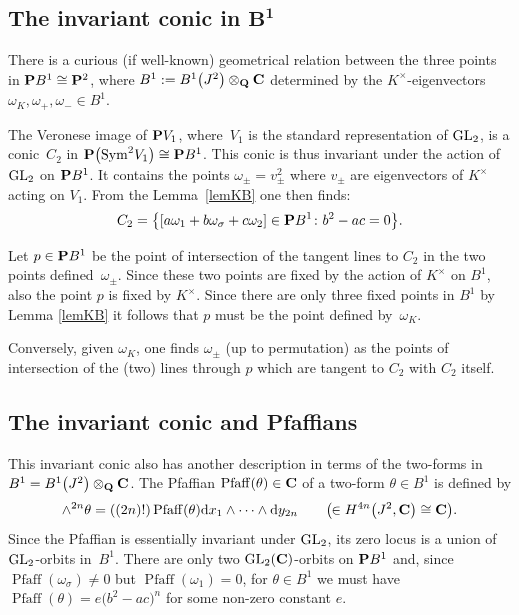 \documentclass[10pt,a4paper]{amsart}
\numberwithin{equation}{section}
\begin{document}
\subsection[The invariant conic in B\^{}1]{The invariant conic in $\boldsymbol{B^1}$}\label{invcon}

There is a curious (if well-known) geometrical relation between the three
points in ${\bf P} B^1\cong{\bf P}^2$, where $B^1:=B^1\big(J^2\big)\otimes_{\bf Q} {\bf C}$
determined by the $K^\times$-eigenvectors
$\omega_K, \omega_+, \omega_-\in B^1$.

The Veronese image of ${\bf P} V_1$, where~$V_1$ is the standard representation of ${\rm GL}_2$,
is a conic~$C_2$ in ${\bf P}\big({\operatorname{Sym}}^2 V_1\big)\cong{\bf P} B^1$. This conic is thus invariant under the action
of ${\rm GL}_2$ on ${\bf P} B^1$.
It contains the points $\omega_\pm=v^2_\pm$
where $v_\pm$ are eigenvectors of $K^\times$ acting on $V_1$.
From the Lemma~\ref{lemKB} one then finds:
\[
C_2 = \big\{[a\omega_1+b\omega_\sigma+c\omega_2] \in {\bf P} B^1\colon b^2-ac = 0 \big\}.
\]

Let $p\in {\bf P} B^1$ be the point of intersection of the tangent lines to $C_2$ in the
two points defined~$\omega_\pm$. Since these two points are fixed by the action of $K^\times$
on $B^1$, also the point $p$ is fixed by $K^\times$. Since there are only three fixed
points in $B^1$ by Lemma \ref{lemKB} it follows that $p$ must be the point
defined by~$\omega_K$.

Conversely, given $\omega_K$, one finds $\omega_\pm$ (up to permutation) as the
points of intersection of the (two) lines through $p$ which are tangent to $C_2$
with $C_2$ itself.

\subsection{The invariant conic and Pfaffians} \label{pfaff}
This invariant conic also has another description in terms of the two-forms in
$B^1=B^1\big(J^2\big)\otimes_{\bf Q}{\bf C}$.
The Pfaffian $\operatorname{Pfaff}(\theta)\in{\bf C}$ of a two-form $\theta\in B^1$
is defined by
\[
\wedge^{2n}\theta =
((2n)!)\operatorname{Pfaff}(\theta){\rm d} x_1\wedge\dots\wedge{\rm d} y_{2n}\qquad\big(\!\!\in H^{4n}\big(J^2,{\bf C}\big) \cong {\bf C}\big).
\]
Since the Pfaffian is essentially invariant under ${\rm GL}_2$, its zero locus is a union of
${\rm GL}_2$-orbits in~$B^1$. There are only two ${\rm GL}_2({\bf C})$-orbits on ${\bf P} B^1$
and, since $\operatorname{Pfaff}(\omega_\sigma)\neq 0$ but
$\operatorname{Pfaff}(\omega_1)=0$, for $\theta\in B^1$ we must have $\operatorname{Pfaff}(\theta)=e\big(b^2-ac\big)^n$
for some non-zero constant $e$.
\end{document}
